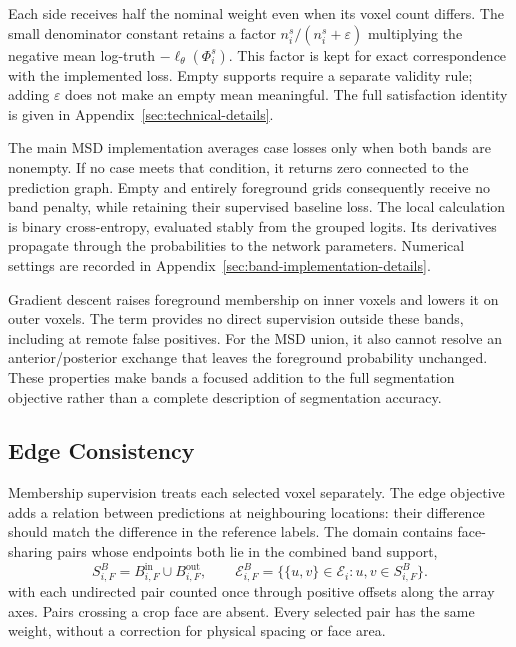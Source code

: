 \documentclass[12pt,a4paper]{article}
\begin{document}
Each side receives half the nominal weight even when its voxel count
differs. The small denominator constant retains a factor
$n_i^s/(n_i^s+\varepsilon)$ multiplying the negative mean log-truth
$-\ell_\theta(\Phi_i^s)$. This factor is kept for exact correspondence
with the implemented loss. Empty supports require a separate validity
rule; adding $\varepsilon$ does not make an empty mean meaningful.
The full satisfaction identity is given in
Appendix~\ref{sec:technical-details}.

The main MSD implementation averages case losses only when both bands
are nonempty. If no case meets that condition, it returns zero connected
to the prediction graph. Empty and entirely foreground grids consequently
receive no band penalty, while retaining their supervised baseline loss.
The local calculation is binary cross-entropy, evaluated stably from
the grouped logits. Its derivatives propagate through the probabilities
to the network parameters. Numerical settings are recorded in
Appendix~\ref{sec:band-implementation-details}.

Gradient descent raises foreground membership on inner voxels and lowers
it on outer voxels. The term provides no direct supervision outside
these bands, including at remote false positives. For the MSD union,
it also cannot resolve an anterior/posterior exchange that leaves the
foreground probability unchanged. These properties make bands a focused
addition to the full segmentation objective rather than a complete
description of segmentation accuracy.

\subsection{Edge Consistency}\label{sec:edge-constraints}

Membership supervision treats each selected voxel separately. The edge
objective adds a relation between predictions at neighbouring locations:
their difference should match the difference in the reference labels.
The domain contains face-sharing pairs whose endpoints both lie in the
combined band support,
\begin{equation}
S_{i,F}^{B}=B_{i,F}^{\mathrm{in}}\cup B_{i,F}^{\mathrm{out}},
\qquad
\mathcal{E}_{i,F}^{B}
=\bigl\{\{u,v\}\in\mathcal{E}_i:
          u,v\in S_{i,F}^{B}\bigr\}.
\label{eq:edge-supported-pairs}
\end{equation}
with each undirected pair counted once through positive offsets along
the array axes. Pairs crossing a crop face are absent. Every selected
pair has the same weight, without a correction for physical spacing or
face area.
\end{document}
